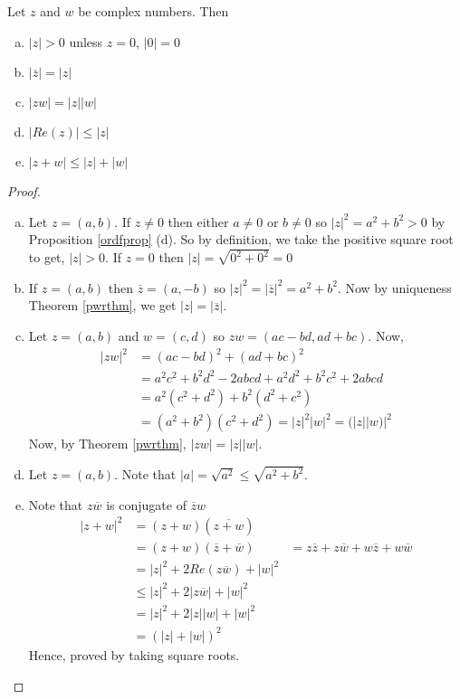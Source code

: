 \begin{thm}
	Let $z$ and $w$ be complex numbers. Then
	\begin{enumerate}[a)]
		\item $|z| > 0$ unless $z = 0$, $|0| = 0$
		\item $|\overline{z}| = |z|$
		\item $|zw| = |z||w|$
		\item $|Re (z)| \leq |z|$
		\item $|z + w| \leq |z| + |w|$
	\end{enumerate}
	\begin{proof}
		\begin{enumerate}[a)]
			\item Let $z = (a, b)$. If $z \neq 0$ then either $a \neq 0$ or $b \neq 0$ so $|z|^2 = a^2 + b^2 > 0$ by Proposition \ref{ordfprop} (d).
			So by definition, we take the positive square root to get, $|z| > 0$.
			If $z = 0$ then $|z| = \sqrt{0^2 + 0^2} = 0$

			\item If $z = (a, b)$ then $\overline{z} = (a, -b)$ so $|z|^2 = |\overline{z}|^2 = a^2 + b^2$.
			Now by uniqueness Theorem \ref{pwrthm}, we get $|z| = |\overline{z}|$.

			\item Let $z = (a, b)$ and $w = (c, d)$ so $zw = (ac - bd, ad + bc)$.
			Now,
			\begin{align*}
			|zw|^2 & = (ac - bd)^2 + (ad + bc)^2 \\
				& = a^2 c^2 + b^2 d^2 - 2abcd + a^2 d^2 + b^2 c^2 + 2abcd \\
				& = a^2(c^2 + d^2) + b^2(d^2 + c^2) \\
				& = (a^2 + b^2) (c^2 + d^2) = |z|^2 |w|^2 = (|z||w)|^2
			\end{align*}
			Now, by Theorem \ref{pwrthm}, $|zw| = |z||w|$.

			\item Let $z = (a, b)$. Note that $|a| = \sqrt{a^2} \leq \sqrt{a^2 + b^2}$.

			\item Note that $z \overline{w}$ is conjugate of $\overline{z} w$
			\begin{align*}
				|z + w|^2 & = (z + w)(\overline{z + w}) \\
						& = (z + w)(\overline{z} + \overline{w})
						& = z \overline{z} + z \overline{w} + w \overline{z} + w \overline{w} \\
						& = |z|^2 + 2 Re(z \overline{w}) + |w|^2 \\
						& \leq |z|^2 + 2 |z \overline{w}| + |w|^2 \\
						& = |z|^2 + 2|z||w| + |w|^2 \\
						& = (|z| + |w|)^2
			\end{align*}
			Hence, proved by taking square roots.
		\end{enumerate}
	\end{proof}
\end{thm}

